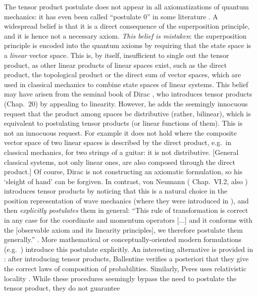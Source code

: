 \documentclass[aps,prl,amsmath,amssymb,twocolumn,nofootinbib]{revtex4}
\theoremstyle{plain}
\theoremstyle{definition}
\theoremstyle{remark}
\begin{document}
	
	The tensor product postulate does not appear in all axiomatizations of
	quantum mechanics: it has even been called ``postulate 0'' in some
	literature \cite{zurek}. A widespread belief is that it is a direct
	consequence of the superposition principle, and it is hence not a
	necessary axiom. {\em This belief is mistaken}: the superposition
	principle is encoded into the quantum axioms by requiring that the
	state space is a {\em linear} vector space. This is, by itself,
	insufficient to single out the tensor product, as other linear
	products of linear spaces exist, such as the direct product, the
	topological product or the direct sum of vector spaces, which are used
	in classical mechanics to combine state spaces of linear systems.
	This belief may have arisen from the seminal book of Dirac
	\cite{diracbook}, who introduces tensor products (Chap.~20) by
	appealing to linearity. However, he adds the seemingly innocuous
	request that the product among spaces be distributive (rather,
	bilinear), which is equivalent to postulating tensor products (or
	linear functions of them). This is not an innocuous request. For
	example it does not hold where the composite vector space of two
	linear spaces is described by the direct product, e.g.~in classical
	mechanics, for two strings of a guitar: it is not distributive.
	[General classical systems, not only linear ones, are also composed
	through the direct product.] Of course, Dirac is not constructing an axiomatic
	formulation, so his `sleight of hand' can be forgiven. In contrast, von
	Neumann (\cite{vonneumannbook} Chap.~VI.2, also \cite{jauch})
	introduces tensor products by noticing that this is a natural choice
	in the position representation of wave mechanics (where they were
	introduced in \cite{weyl,epr}), and then {\em explicitly postulates}
	them in general: ``This rule of transformation is correct in any case
	for the coordinate and momentum operators [...] and it conforms with
	the [observable axiom and its linearity principles], we therefore
	postulate them generally.''  \cite{vonneumannbook}.  More mathematical
	or conceptually-oriented modern formulations
	(e.g.~\cite{ozawa,masanes,nielsenchuang}) introduce this postulate explicitly.
	An interesting alternative is provided in
	\cite{ballentinebook,ballentinepaper}: after introducing tensor
	products, Ballentine verifies a posteriori that they give the correct
	laws of composition of probabilities. Similarly, Peres uses
	relativistic locality \cite{peres}. While these procedures seemingly
	bypass the need to postulate the tensor product, they do not guarantee
\end{document}
